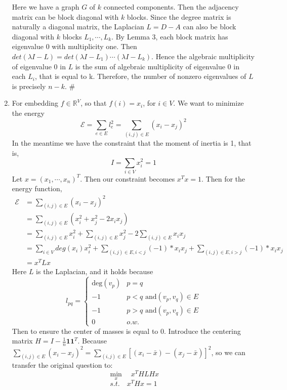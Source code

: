 \documentclass[twoside,11pt]{homework}
\begin{document}
\begin{enumerate}
    Here we have a graph $G$ of $k$ connected components. Then the adjacency matrix can be block diagonal with $k$ blocks. Since the degree matrix is naturally a diagonal matrix, the Laplacian $L=D-A$ can also be block diagonal with $k$ blocks $L_1, \cdots,L_k$. By Lemma 3, each block matrix has eigenvalue 0 with multiplicity one. Then $det(\lambda I-L) = det(\lambda I -L_1)\cdots(\lambda I -L_k)$. Hence the algebraic multiplicity of eigenvalue 0 in $L$ is the sum of algebraic multiplicity of eigenvalue 0 in each $L_i$, that is equal to k. Therefore, the number of nonzero eigenvalues of $L$ is precisely $n-k$. \#
    
    
    
    \item
    For embedding $f \in \mathbb{R}^V$, so that $f(i)=x_i$, for $i \in V$. We want to minimize the energy $$\mathcal{E}=\sum_{e \in E} l_e^2 = \sum_{(i,j) \in E} (x_i - x_j)^2$$
    In the meantime we have the constraint that the moment of inertia is 1, that is,
    $$I=\sum_{i \in V}x_i^2  = 1$$
    Let $x=(x_1,\cdots,x_n)^T$. Then our constraint becomes $x^Tx=1$.
    Then for the energy function, 
    \begin{align*}
        \mathcal{E} &= \sum_{(i,j)\in E}(x_i-x_j)^2 \\
        &=\sum_{(i,j)\in E} (x_i^2+x_j^2-2x_ix_j)\\
        &=\sum_{(i,j) \in E}x_i^2 + \sum_{(i,j) \in E}x_j^2 - 2\sum_{(i,j) \in E}x_ix_j\\
        &=\sum_{i \in V} deg(x_i)x_i^2 + \sum_{(i,j) \in E,i<j}(-1)*x_ix_j + \sum_{(i,j) \in E,i>j}(-1)*x_ix_j\\
        &=x^TLx
    \end{align*}
    Here $L$ is the Laplacian, and it holds because
     \begin{equation*}
        l_{pq} = 
        \begin{cases}
        \text{deg}(v_p)& p=q\\
        -1& p < q \text{ and} (v_p,v_q) \in E\\
        -1& p > q \text{ and} (v_p,v_q) \in E\\
        0& o.w.
        \end{cases}
    \end{equation*}
    Then to ensure the center of masses is equal to 0. Introduce the centering matrix $H = I -\frac{1}{n}\textbf{1}\textbf{1}^T$. Because
    $\sum_{(i,j)\in E}(x_i-x_j)^2 = \sum_{(i,j) \in E}[(x_i-\bar{x})-(x_j-\bar{x})]^2$, so we can transfer the original question to:
    $$\underset{x}{\min}\quad x^THLHx$$
    $$s.t.\quad x^T Hx=1$$
    

\end{enumerate}
\end{document}
